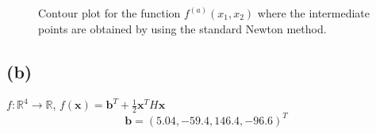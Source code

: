 \documentclass[a4paper,11pt]{article}
\begin{document}
	
	\begin{figure}[H]
		\centering
		 \quad
		\caption{Contour plot for the function $f^{(a)}(x_{1},x_{2})$ where the intermediate points are obtained by using the standard Newton method.}
		\label{Fig:func_a}
	\end{figure}

	\subsection{(b)}
	$f:\mathbb{R}^{4} \rightarrow  \mathbb{R}$, $f(\textbf{x}) = \textbf{b}^{T} + \frac{1}{2}\textbf{x}^{T}H\textbf{x}$
	\begin{equation}
		\textbf{b} = (5.04, -59.4, 146.4, -96.6)^{T}
	\end{equation}
\end{document}
